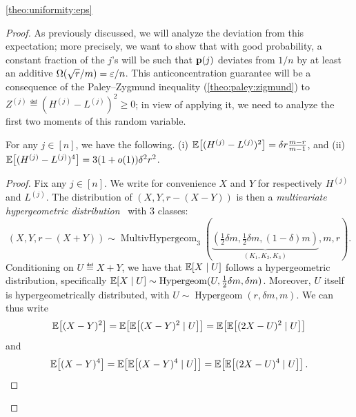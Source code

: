 \begin{proofof}{\cref{theo:uniformity:eps}}
\begin{proof}
As previously discussed, we will analyze the deviation from this expectation; more precisely, we want to show that with good probability, a constant fraction of the $j$'s will be such that $\mathbf{p}(j)$ deviates from ${1}/{n}$ by at least an additive $\bigOmega{{\sqrt{r}}/{m}} = {\eps}/{n}$. This anticoncentration guarantee will be a consequence of the Paley--Zygmund inequality (\cref{theo:paley:zigmund}) to $Z^{(j)}\eqdef (H^{(j)} - L^{(j)})^2 \geq 0$; in view of applying it, we need to analyze the first two moments of this random variable.
  \begin{lemma}\label{lemma:eps:uniformity:soundness:anticoncentration}
    For any $j\in[n]$, we have the following. (i) $\mathbb{E}\!\left[(H^{(j)} - L^{(j)})^2\right] = \delta r \frac{m-r}{m-1}$, and (ii)~$\mathbb{E}\!\left[(H^{(j)} - L^{(j)})^4\right] = 3(1+o(1)) \delta^2 r^2$.
  \end{lemma}
  \begin{proof}
Fix any $j\in[n]$. We write for convenience $X$ and $Y$ for respectively $H^{(j)}$ and $L^{(j)}$. The distribution of $(X,Y,r-(X-Y))$ is then a \emph{multivariate hypergeometric distribution}~\cite{wiki:hypergeom} with $3$ classes:
\[
(X,Y,r-(X+Y))\sim \operatorname{MultivHypergeom}_3(\underbrace{(\tfrac{1}{2}\delta m,\tfrac{1}{2}\delta m,(1-\delta) m)}_{(K_1,K_2,K_3)}, m, r).
\]
Conditioning on $U\eqdef X+Y$, we have that $\mathbb{E}\!\left[X\mid U\right]$ follows a hypergeometric distribution, specifically $\mathbb{E}\!\left[X\mid U\right] \sim \operatorname{Hypergeom}(U, \frac{1}{2} \delta m, \delta m)$. Moreover, $U$ itself is hypergeometrically distributed, with
$U \sim \operatorname{Hypergeom}(r, \delta m, m)$. We can thus write
\[
\mathbb{E}\!\left[(X-Y)^2\right] = \mathbb{E}\!\left[ \mathbb{E}\!\left[(X-Y)^2\mid U \right]\right] = \mathbb{E}\!\left[\mathbb{E}\!\left[(2X-U)^2\mid U \right]\right]
\]
and
\[
\mathbb{E}\!\left[(X-Y)^4\right] = \mathbb{E}\!\left[ \mathbb{E}\!\left[(X-Y)^4\mid U \right]\right] = \mathbb{E}\!\left[\mathbb{E}\!\left[(2X-U)^4\mid U \right]\right].
\]


\end{proof}
\end{proof}
\end{proofof}
